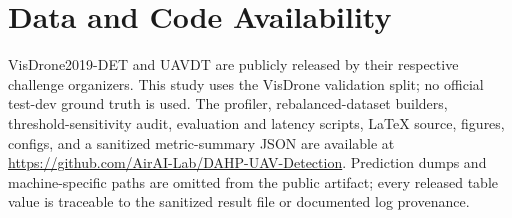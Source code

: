 \documentclass[journal]{IEEEtran}
\newcommand{\visdrone}{VisDrone2019-DET}
\newcommand{\uavdt}{UAVDT}
\begin{document}
\section*{Data and Code Availability}
\visdrone{} and \uavdt{} are publicly released by their respective challenge organizers. This study uses the VisDrone validation split; no official test-dev ground truth is used. The profiler, rebalanced-dataset builders, threshold-sensitivity audit, evaluation and latency scripts, LaTeX source, figures, configs, and a sanitized metric-summary JSON are available at \url{https://github.com/AirAI-Lab/DAHP-UAV-Detection}. Prediction dumps and machine-specific paths are omitted from the public artifact; every released table value is traceable to the sanitized result file or documented log provenance.

\appendix

\end{document}
